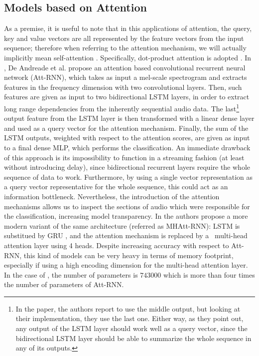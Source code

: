 \subsection{Models based on Attention}
As a premise, it is useful to note that in this applications of attention, the query, key and value vectors are all represented by the feature vectors from the input sequence; therefore when referring to the attention mechanism, we will actually implicitly mean self-attention \cite{selfatt2016cheng}. Specifically, dot-product attention is adopted \cite{luong2015effective}.
In \cite{attention2018andreade}, De Andreade et al. propose an attention based convolutional recurrent neural network (Att-RNN), which takes as input a mel-scale spectrogram and extracts features in the frequency dimension with two convolutional layers. Then, such features are given as input to two bidirectional LSTM \cite{hochreiter1997long} layers, in order to extract long range dependencies from the inherently sequential audio data. The last\footnote{In the paper, the authors report to use the middle output, but looking at their implementation, they use the last one. Either way, as they point out, any output of the LSTM layer should work well as a query vector, since the bidirectional LSTM layer should be able to summarize the whole sequence in any of its outputs.} output feature from the LSTM layer is then transformed with a linear dense layer and used as a query vector for the attention mechanism. Finally, the sum of the LSTM outputs, weighted with respect to the attention scores, are given as input to a final dense MLP, which performs the classification. An immediate drawback of this approach is its impossibility to function in a streaming fashion (at least without introducing delay), since bidirectional recurrent layers require the whole sequence of data to work. Furthermore, by using a single vector representation as a query vector representative for the whole sequence, this could act as an information bottleneck. Nevertheless, the introduction of the attention mechanisms allows us to inspect the sections of audio which were responsible for the classification, increasing model transparency. In \cite{streamingkws2020Rybakov} the authors propose a more modern variant of the same architecture (referred as MHAtt-RNN): LSTM is substitued by GRU \cite{Cho2014gru}, and the attention mechanism is replaced by a ~\mbox{multi-head} attention layer using 4 heads. Despite increasing accuracy with respect to Att-RNN, this kind of models can be very heavy in terms of memory footprint, especially if using a high encoding dimension for the multi-head attention layer. In the case of \cite{streamingkws2020Rybakov}, the number of parameters is $743000$ which is more than four times the number of parameters of Att-RNN.

